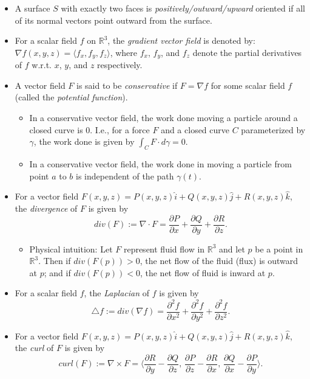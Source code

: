 \documentclass[12pt]{article}
\begin{document}
\begin{itemize}
\item A surface $S$ with exactly two faces is {\it positively/outward/upward}
oriented if all of its normal vectors point outward from the surface.
\item For a scalar field $f$ on $\mathbb{R}^3$, the {\it gradient vector field}
is denoted by: $\nabla f(x,y,z) = \langle f_x, f_y, f_z \rangle$, where 
$f_x$, $f_y$, and $f_z$ denote the partial derivatives of $f$ w.r.t. $x$, $y$,
and $z$ respectively.
\item A vector field $F$ is said to be {\it conservative} if $F = \nabla f$ for
some scalar field $f$ (called the {\it potential function}).
\begin{itemize}
\item In a conservative vector field, the work done moving a particle around
a closed curve is 0. I.e., for a force $F$ and a closed curve $C$ parameterized
by $\gamma$, the work done is given by $\int_C F \cdot d\gamma = 0$.
\item In a conservative vector field, the work done in moving a particle from
point $a$ to $b$ is independent of the path $\gamma(t)$.
\end{itemize}
\item For a vector field 
$F(x,y,z) = P(x,y,z)\hat{i} + Q(x,y,z)\hat{j} + R(x,y,z)\hat{k}$, 
the {\it divergence} of $F$ is given by 
$$
div(F) := \nabla \cdot F 
= \frac{\partial P}{\partial x}+\frac{\partial Q}{\partial y}
+\frac{\partial R}{\partial z}.
$$
\begin{itemize}
\item Physical intuition: Let $F$ represent fluid flow in $\mathbb{R}^3$ and
let $p$ be a point in $\mathbb{R}^3$.
Then if $div(F(p)) > 0$, the net flow of the fluid (flux) is outward
at $p$; and if $div(F(p)) < 0$, the net flow of fluid is inward at $p$.
\end{itemize}
\item For a scalar field $f$, the {\it Laplacian} of $f$ is given by
$$
\bigtriangleup f := div( \nabla f)
= \frac{\partial^2 f}{\partial x^2}+\frac{\partial^2 f}{\partial y^2}
+\frac{\partial^2 f}{\partial z^2}.
$$
\item For a vector field
$F(x,y,z) = P(x,y,z)\hat{i} + Q(x,y,z)\hat{j} + R(x,y,z)\hat{k}$, 
the {\it curl} of $F$ is given by
$$
curl(F) := \nabla \times F
= \langle \frac{\partial R}{\partial y} - \frac{\partial Q}{\partial z}
\text{, } \frac{\partial P}{\partial z} - \frac{\partial R}{\partial x}
\text{, } \frac{\partial Q}{\partial x} - \frac{\partial P}{\partial y}
\rangle.
$$
\end{itemize}
\end{document}
